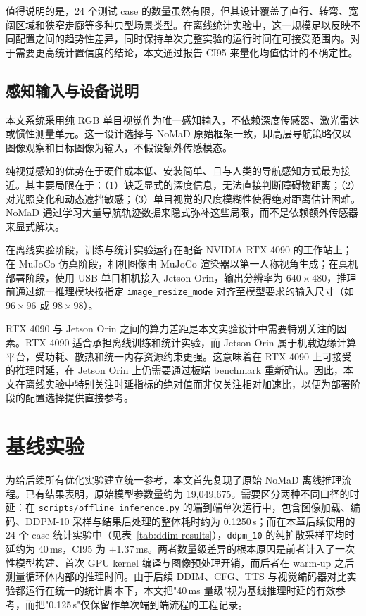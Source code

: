 值得说明的是，24 个测试 case 的数量虽然有限，但其设计覆盖了直行、转弯、宽阔区域和狭窄走廊等多种典型场景类型。在离线统计实验中，这一规模足以反映不同配置之间的趋势性差异，同时保持单次完整实验的运行时间在可接受范围内。对于需要更高统计置信度的结论，本文通过报告 CI95 来量化均值估计的不确定性。

\subsection{感知输入与设备说明}

本文系统采用纯 RGB 单目视觉作为唯一感知输入，不依赖深度传感器、激光雷达或惯性测量单元。这一设计选择与 NoMaD 原始框架一致，即高层导航策略仅以图像观察和目标图像为输入，不假设额外传感模态。

纯视觉感知的优势在于硬件成本低、安装简单、且与人类的导航感知方式最为接近。其主要局限在于：（1）缺乏显式的深度信息，无法直接判断障碍物距离；（2）对光照变化和动态遮挡敏感；（3）单目视觉的尺度模糊性使得绝对距离估计困难。NoMaD 通过学习大量导航轨迹数据来隐式弥补这些局限，而不是依赖额外传感器来显式解决。

在离线实验阶段，训练与统计实验运行在配备 NVIDIA RTX 4090 的工作站上；在 MuJoCo 仿真阶段，相机图像由 MuJoCo 渲染器以第一人称视角生成；在真机部署阶段，使用 USB 单目相机接入 Jetson Orin，输出分辨率为 $640\times480$，推理前通过统一推理模块按指定 \texttt{image\_resize\_mode} 对齐至模型要求的输入尺寸（如 $96\times96$ 或 $98\times98$）。

RTX 4090 与 Jetson Orin 之间的算力差距是本文实验设计中需要特别关注的因素。RTX 4090 适合承担离线训练和统计实验，而 Jetson Orin 属于机载边缘计算平台，受功耗、散热和统一内存资源约束更强。这意味着在 RTX 4090 上可接受的推理时延，在 Jetson Orin 上仍需要通过板端 benchmark 重新确认。因此，本文在离线实验中特别关注时延指标的绝对值而非仅关注相对加速比，以便为部署阶段的配置选择提供直接参考。

\section{基线实验}

为给后续所有优化实验建立统一参考，本文首先复现了原始 NoMaD 离线推理流程。已有结果表明，原始模型参数量约为 19,049,675。需要区分两种不同口径的时延：在 \texttt{scripts/offline\_inference.py} 的端到端单次运行中，包含图像加载、编码、DDPM-10 采样与结果后处理的整体耗时约为 0.1250\,s；而在本章后续使用的 24 个 case 统计实验中（见表~\ref{tab:ddim-results}），\texttt{ddpm\_10} 的纯扩散采样平均时延约为 40\,ms，CI95 为 $\pm$1.37\,ms。两者数量级差异的根本原因是前者计入了一次性模型构建、首次 GPU kernel 编译与图像预处理开销，而后者在 warm-up 之后测量循环体内部的推理时间。由于后续 DDIM、CFG、TTS 与视觉编码器对比实验都运行在统一的统计脚本下，本文把"40\,ms 量级"视为基线推理时延的有效参考，而把"0.125\,s"仅保留作单次端到端流程的工程记录。

